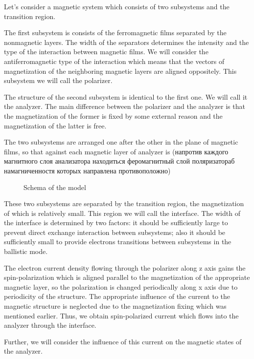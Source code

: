 \newpage

Let's consider a magnetic system which consists of two subsystems and the transition region.

The first subsystem is consists of the ferromagnetic films separated by the nonmagnetic layers. The width of the separators determines the intensity and the type of the interaction between magnetic films. We will consider the antiferromagnetic type of the interaction which means that the vectors of magnetization of the neighboring magnetic layers are aligned oppositely. This subsystem we will call the polarizer.

The structure of the second subsystem is identical to the first one. We will call it the analyzer. The main difference between the polarizer and the analyzer is that the magnetization of the former is fixed by some external reason and the magnetization of the latter is free.

The two subsystems are arranged one after the other in the plane of magnetic films, so that against each magnetic layer of analyzer is  (напротив каждого магнитного слоя анализатора находиться феромагнитный слой поляризатораб намагниченностя которых направлена противоположно)

\begin{figure}[h]
	\centering
	
	\caption{Schema of the model}
	\label{fig:model}
\end{figure}

These two subsystems are separated by the transition region, the magnetization of which is relatively small. This region we will call the interface. The width of the interface is determined by two factors: it should be sufficiently large to prevent direct exchange interaction between subsystems; also it should be sufficiently small to provide electrons transitions between subsystems in the ballistic mode.

The electron current density flowing through the polarizer along z axis gains the spin-polarization which is aligned parallel to the magnetization of the appropriate magnetic layer, so the polarization is changed periodically along x axis due to periodicity of the structure. The appropriate influence of the current to the magnetic structure is neglected due to the magnetization fixing which was mentioned earlier. Thus, we obtain spin-polarized current which flows into the analyzer through the interface.

Further, we will consider the influence of this current on the magnetic states of the analyzer.

